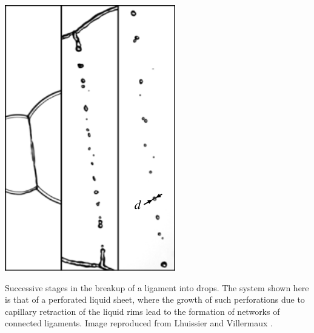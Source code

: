 \begin{marginfigure}
\centering
\includegraphics{plots/ligament_breakup/lig_sheet_hole.png}
\caption{Successive stages in the breakup of a ligament into drops. 
	The system shown here is that of a perforated liquid sheet, 
	where the growth of such perforations due to capillary retraction 
	of the liquid rims lead to the formation of networks of connected ligaments. 
	Image reproduced from Lhuissier and Villermaux \cite{sheet_hole}.
	}
\label{lig_network}
\end{marginfigure}



